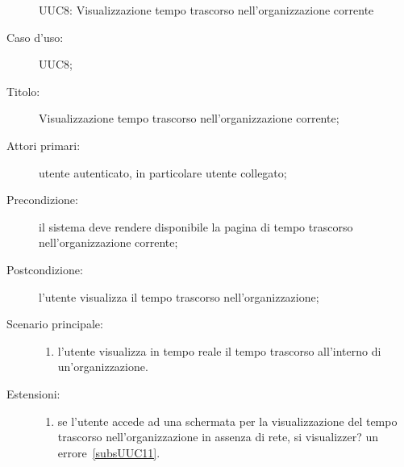 \documentclass[../../../analisi-dei-requisiti.tex]{subfiles}
\begin{document}
\begin{figure}[H]
  \centering
  \caption{UUC8: Visualizzazione tempo trascorso nell'organizzazione corrente}%
  \label{fig:UUC8}
\end{figure}

\begin{description}
  \item[Caso d'uso:] UUC8;
  \item[Titolo:] Visualizzazione tempo trascorso nell'organizzazione corrente;
  \item[Attori primari:] utente autenticato, in particolare utente collegato;
  \item[Precondizione:] il sistema deve rendere disponibile la pagina di tempo trascorso nell'organizzazione corrente;
  \item[Postcondizione:] l'utente visualizza il tempo trascorso nell'organizzazione;
  \item[Scenario principale:]
        \begin{enumerate}
          \item l'utente visualizza in tempo reale il tempo trascorso all'interno di un'organizzazione.
        \end{enumerate}
  \item[Estensioni:]
        \begin{enumerate}
          \item se l'utente accede ad una schermata per la visualizzazione del tempo trascorso nell'organizzazione in assenza di rete, si visualizzer? un errore~\ref{subsUUC11}.
        \end{enumerate}
\end{description}
\end{document}
